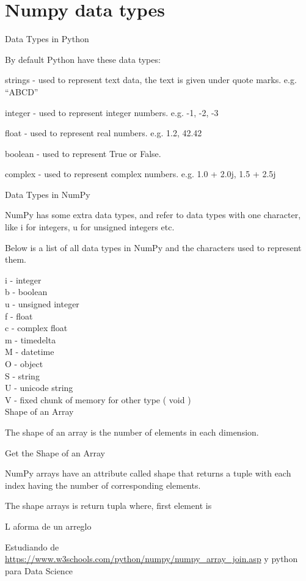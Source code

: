 \section{Numpy data types}

Data Types in Python

By default Python have these data types:

strings - used to represent text data, the text is given under quote marks. e.g. ``ABCD''


integer - used to represent integer numbers. e.g. -1, -2, -3

float - used to represent real numbers. e.g. 1.2, 42.42

boolean - used to represent True or False.

complex - used to represent complex numbers. e.g. 1.0 + 2.0j, 1.5 + 2.5j

Data Types in NumPy

NumPy has some extra data types, and refer to data types with one character, like i for integers, u for unsigned integers etc.

Below is a list of all data types in NumPy and the characters used to represent them.

i - integer\\
b - boolean\\
u - unsigned integer\\
f - float\\
c - complex float\\
m - timedelta\\
M - datetime\\
O - object\\
S - string\\
U - unicode string\\
V - fixed chunk of memory for other type ( void )\\


Shape of an Array

The shape of an array is the number of elements in each dimension.

Get the Shape of an Array

NumPy arrays have an attribute called shape that returns a tuple with each index having the number of corresponding elements.

The shape arrays is return tupla where, first element is 

L aforma de un arreglo 


Estudiando de 
\url{https://www.w3schools.com/python/numpy/numpy_array_join.asp} y python para Data Science
